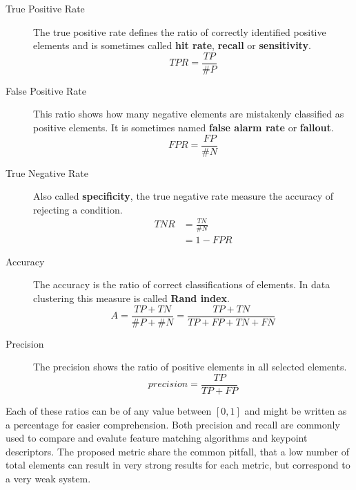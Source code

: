 \begin{description}
    \item[True Positive Rate] The true positive rate defines the ratio of correctly identified positive elements and is sometimes called \textbf{hit rate}, \textbf{recall} or \textbf{sensitivity}.
        \begin{equation}
            TPR = \frac{TP}{\#P}
            \label{eq:true_positive_rate}
        \end{equation}
    \item[False Positive Rate] This ratio shows how many negative elements are mistakenly classified as positive elements. It is sometimes named \textbf{false alarm rate} or \textbf{fallout}.
        \begin{equation}
            FPR = \frac{FP}{\#N}
            \label{eq:false_positive_rate}
        \end{equation}
    \item[True Negative Rate] Also called \textbf{specificity}, the true negative rate measure the accuracy of rejecting a condition.
        \begin{equation}
        \begin{aligned}
            TNR &= \frac{TN}{\#N} \\
                &= 1 - FPR
        \end{aligned}
        \label{eq:true_negative_rate}
        \end{equation}
    \item[Accuracy] The accuracy is the ratio of correct classifications of elements. In data clustering this measure is called \textbf{Rand index}.
        \begin{equation}
            A = \frac{TP + TN}{\#P + \#N} = \frac{TP + TN}{TP + FP + TN + FN}
            \label{eq:accuracy}
        \end{equation}
    \item[Precision] The precision shows the ratio of positive elements in all selected elements.
        \begin{equation}
            precision = \frac{TP}{TP + FP}
        \end{equation}
\end{description}
Each of these ratios can be of any value between $[0, 1]$ and might be written as a percentage for easier comprehension.
Both precision and recall are commonly used to compare and evalute feature matching algorithms and keypoint descriptors.
The proposed metric share the common pitfall, that a low number of total elements can result in very strong results for each metric, but correspond to a very weak system.


